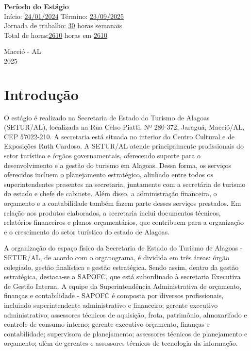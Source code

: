 \documentclass[12pt,a4paper]{article}
\begin{document}
	\vspace{0.5cm}
	\noindent \textbf{Período do Estágio} \\
	Início: \underline{24/01/2024\hspace{0,0cm}} \quad Término: \underline{23/09/2025\hspace{0,0cm}} \\
	Jornada de trabalho: \underline{30\hspace{0.0cm}} horas semanais \\
	Total de horas:\underline{2610\hspace{0,0cm}} horas em  \underline{2610\hspace{0,0cm}} \\
	
	\vfill
	\begin{flushright}
		\centering Maceió - AL \\
		2025
	\end{flushright}
	
	\newpage
	
	\section{Introdução}
	
	\hspace*{1.5cm}O estágio é realizado na Secretaria de Estado do Turismo de Alagoas (SETUR/AL), localizada na Rua Celso Piatti, Nº 280-372, Jaraguá, Maceió/AL, CEP 57022-210. A secretaria está situada no interior do Centro Cultural e de Exposições Ruth Cardoso. A SETUR/AL atende principalmente profissionais do setor turístico e órgãos governamentais, oferecendo suporte para o desenvolvimento e a gestão do turismo em Alagoas. Dessa forma, os serviços oferecidos incluem o planejamento estratégico, alinhado entre todos os superintendentes presentes na secretaria, juntamente com a secretária de turismo do estado e chefe de cabinete. Além disso, a administração financeira, o orçamento e a contabilidade também fazem parte desses serviços prestados. Em relação aos produtos elaborados, a secretaria inclui documentos técnicos, relatórios financeiros e planos orçamentários, que contribuem para a organização e o crescimento do setor turístico do estado de Alagoas.
	
	A organização do espaço físico da Secretaria de Estado do Turismo de Alagoas - SETUR/AL, de acordo com o organograma, é dividida em três áreas: órgão colegiado, gestão finalística e gestão estratégica. Sendo assim, dentro da gestão estratégica, destaca-se a SAPOFC, que está subordinado à secretaria Executiva de Gestão Interna.
	A equipe da Superintendência Administrativa de orçamento, finanças e contabilidade - SAPOFC é composta por diversos profissionais, incluindo superintendente administrativo e financeiro; gerente executivo administrativo; assessores técnicos de aquisição, frota, patrimônio, almoxarifado e controle de consumo interno; gerente executivo orçamento, finanças e contabilidade; supervisora de planejamento; assessores técnicos de planejamento e orçamento; além de gerentes e assessores técnicos de tecnologia da informação. 
	
\end{document}
